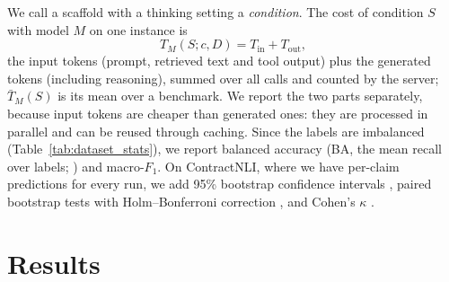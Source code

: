 \documentclass[11pt]{article}
\begin{document}
We call a scaffold with a thinking setting a \emph{condition}. The cost of
condition $S$ with model $M$ on one instance is
\begin{equation}
    T_M(S; c, D) = T_{\mathrm{in}} + T_{\mathrm{out}},
    \label{eq:cost}
\end{equation}
the input tokens (prompt, retrieved text and tool output) plus the
generated tokens (including reasoning), summed over all calls and counted
by the server; $\bar{T}_M(S)$ is its mean over a benchmark. We report the
two parts separately, because input tokens are cheaper than generated
ones: they are processed in parallel and can be reused through caching.
Since the labels are imbalanced (Table~\ref{tab:dataset_stats}), we report
balanced accuracy (BA, the mean recall over labels;
\citealp{brodersen2010balanced}) and macro-$F_1$. On ContractNLI, where we
have per-claim predictions for every run, we add 95\% bootstrap confidence
intervals \citep{efron1993bootstrap}, paired bootstrap tests with
Holm--Bonferroni correction \citep{holm1979}, and Cohen's $\kappa$
\citep{cohen1960kappa}.

\section{Results}
\label{sec:results}
\end{document}
